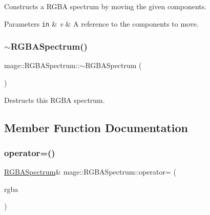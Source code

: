 Constructs a R\+G\+BA spectrum by moving the given components.


\begin{DoxyParams}[1]{Parameters}
\mbox{\tt in}  & {\em v} & A reference to the components to move. \\
\hline
\end{DoxyParams}
\hypertarget{structmage_1_1_r_g_b_a_spectrum_a0b30d3cdb54965f4e9524904ed5fbf85}{}\label{structmage_1_1_r_g_b_a_spectrum_a0b30d3cdb54965f4e9524904ed5fbf85} 
\subsubsection{\texorpdfstring{$\sim$\+R\+G\+B\+A\+Spectrum()}{~RGBASpectrum()}}
{\footnotesize\ttfamily mage\+::\+R\+G\+B\+A\+Spectrum\+::$\sim$\+R\+G\+B\+A\+Spectrum (\begin{DoxyParamCaption}{ }\end{DoxyParamCaption})\hspace{0.3cm}{\ttfamily [default]}}

Destructs this R\+G\+BA spectrum. 

\subsection{Member Function Documentation}
\hypertarget{structmage_1_1_r_g_b_a_spectrum_a1b9910f5ce9cb368b88e1b02fb4c4c72}{}\label{structmage_1_1_r_g_b_a_spectrum_a1b9910f5ce9cb368b88e1b02fb4c4c72} 
\subsubsection{\texorpdfstring{operator=()}{operator=()}\hspace{0.1cm}{\footnotesize\ttfamily [1/2]}}
{\footnotesize\ttfamily \hyperlink{structmage_1_1_r_g_b_a_spectrum}{R\+G\+B\+A\+Spectrum}\& mage\+::\+R\+G\+B\+A\+Spectrum\+::operator= (\begin{DoxyParamCaption}\item[{const \hyperlink{structmage_1_1_r_g_b_a_spectrum}{R\+G\+B\+A\+Spectrum} \&}]{rgba }\end{DoxyParamCaption})\hspace{0.3cm}{\ttfamily [default]}}

